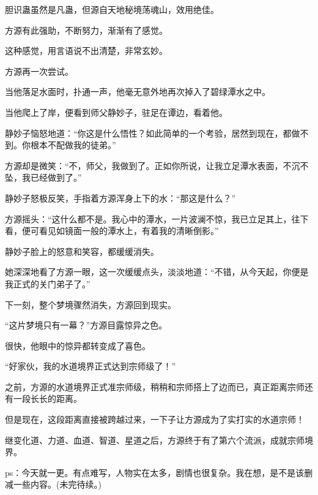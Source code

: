 \begin{this_body}
胆识蛊虽然是凡蛊，但源自天地秘境荡魂山，效用绝佳。

方源有此强助，不断努力，渐渐有了感觉。

这种感觉，用言语说不出清楚，非常玄妙。

方源再一次尝试。

当他落足水面时，扑通一声，他毫无意外地再次掉入了碧绿潭水之中。

当他爬上了岸，便看到师父静妙子，驻足在谭边，看着他。

静妙子恼怒地道：“你这是什么悟性？如此简单的一个考验，居然到现在，都做不到。你根本不配做我的徒弟。”

方源却是微笑：“不，师父，我做到了。正如你所说，让我立足潭水表面，不沉不坠，我已经做到了。”

静妙子怒极反笑，手指着方源浑身上下的水：“那这是什么？”

方源摇头：“这什么都不是。我心中的潭水，一片波澜不惊，我已立足其上，往下看，便可看见如镜面一般的潭水上，有着我的清晰倒影。”

静妙子脸上的怒意和笑容，都缓缓消失。

她深深地看了方源一眼，这一次缓缓点头，淡淡地道：“不错，从今天起，你便是我正式的关门弟子了。”

下一刻，整个梦境骤然消失，方源回到现实。

“这片梦境只有一幕？”方源目露惊异之色。

很快，他眼中的惊异都转变成了喜色。

“好家伙，我的水道境界正式达到宗师级了！”

之前，方源的水道境界正式准宗师级，稍稍和宗师搭上了边而已，真正距离宗师还有一段长长的距离。

但是现在，这段距离直接被跨越过来，一下子让方源成为了实打实的水道宗师！

继变化道、力道、血道、智道、星道之后，方源终于有了第六个流派，成就宗师境界。

ps：今天就一更。有点难写，人物实在太多，剧情也很复杂。我在想，是不是该删减一些内容。(未完待续。)

\end{this_body}

